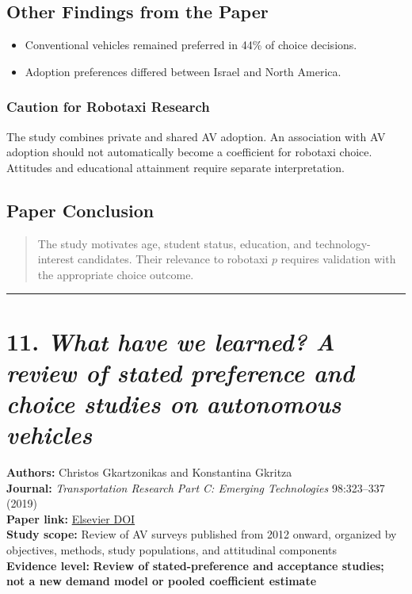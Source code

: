 \documentclass[10pt,a4paper]{article}
\providecommand{\tightlist}{\setlength{\itemsep}{0pt}\setlength{\parskip}{0pt}}
\begin{document}
\subsection{Other Findings from the Paper}

\begin{itemize}
\tightlist
\item
  Conventional vehicles remained preferred in 44\% of choice decisions.
\item
  Adoption preferences differed between Israel and North America.
\end{itemize}

\subsubsection{Caution for Robotaxi Research}

The study combines private and shared AV adoption.
An association with AV adoption should not automatically become
a coefficient for robotaxi choice.
Attitudes and educational attainment require separate interpretation.

\subsection{Paper Conclusion}

\begin{quote}
The study motivates age, student status, education,
and technology-interest candidates.
Their relevance to robotaxi $p$ requires validation
with the appropriate choice outcome.
\end{quote}


\begin{center}\rule{0.5\linewidth}{0.5pt}\end{center}

\hypertarget{review-of-stated-preference-and-choice-studies}{%
\section{\texorpdfstring{11. \emph{What have we learned? A review of stated preference and choice studies on autonomous vehicles}}{11. What have we learned? A review of stated preference and choice studies on autonomous vehicles}}\label{review-of-stated-preference-and-choice-studies}}

\textbf{Authors:} Christos Gkartzonikas and Konstantina Gkritza\\
\textbf{Journal:} \emph{Transportation Research Part C:
Emerging Technologies} 98:323--337 (2019)\\
\textbf{Paper link:}
\href{https://doi.org/10.1016/j.trc.2018.12.003}{Elsevier DOI}\\
\textbf{Study scope:} Review of AV surveys published from 2012 onward,
organized by objectives, methods, study populations,
and attitudinal components\\
\textbf{Evidence level:}
\textbf{Review of stated-preference and acceptance studies;
not a new demand model or pooled coefficient estimate}
\end{document}
